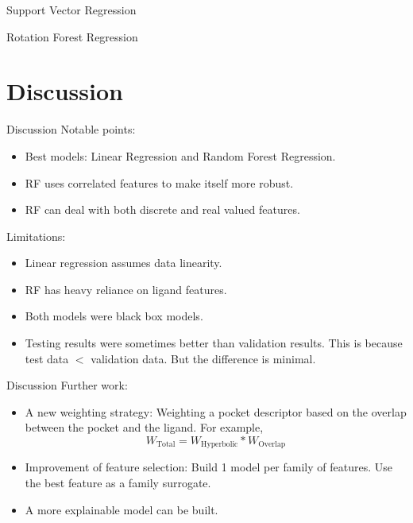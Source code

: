 \documentclass{beamer}
\begin{document}
\begin{frame}[t]{Support Vector Regression}

\end{frame}

\begin{frame}[t]{Rotation Forest Regression}

\end{frame}

\section{Discussion}
\begin{frame}[t]{Discussion}
Notable points:
\begin{itemize}
\item Best models: Linear Regression and Random Forest Regression.
\item RF uses correlated features to make itself more robust.
\item RF can deal with both discrete and real valued features.
\end{itemize} 
Limitations:
\begin{itemize}
\item Linear regression assumes data linearity.
\item RF has heavy reliance on ligand features.
\item Both models were black box models.
\item Testing results were sometimes better than validation results. This is because test data $<$ validation data.
But the difference is minimal.
\end{itemize} 
\end{frame}

\begin{frame}[t]{Discussion}
Further work:
\begin{itemize}
\item A new weighting strategy: Weighting a pocket descriptor based on the overlap between the pocket and the ligand.  For example,
$$
W_\mathrm{Total} = W_\mathrm{Hyperbolic} * W_\mathrm{Overlap}
$$
\item Improvement of feature selection: Build 1 model per family of features. Use the best feature as a family surrogate.
\item A more explainable model can be built.
\end{itemize} 

\end{frame}
\end{document}
